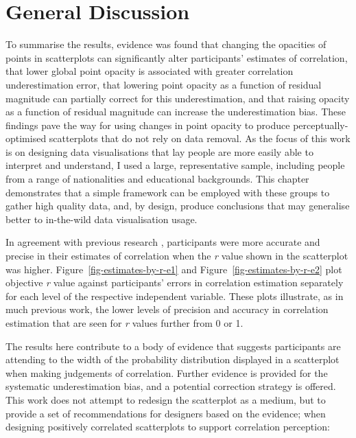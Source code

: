 \documentclass[../main.tex]{subfiles}
\begin{document}
\section{General Discussion}\label{general-discussion-adjusting-opacity}

To summarise the results, evidence was found that changing the opacities
of points in scatterplots can significantly alter participants'
estimates of correlation, that lower global point opacity is associated
with greater correlation underestimation error, that lowering point
opacity as a function of residual magnitude can partially correct for
this underestimation, and that raising opacity as a function of residual
magnitude can increase the underestimation bias. These findings pave the
way for using changes in point opacity to produce perceptually-optimised
scatterplots that do not rely on data removal. As the focus of this work
is on designing data visualisations that lay people are more easily able
to interpret and understand, I used a large, representative sample,
including people from a range of nationalities and educational
backgrounds. This chapter demonstrates that a simple framework can be
employed with these groups to gather high quality data, and, by design,
produce conclusions that may generalise better to in-the-wild data
visualisation usage.

In agreement with previous research
\cite{pollack_1960, rensink_2010, rensink_2012,
rensink_2014, rensink_2017}, participants were more accurate and precise
in their estimates of correlation when the \emph{r} value shown in the
scatterplot was higher. Figure~\ref{fig-estimates-by-r-e1} and
Figure~\ref{fig-estimates-by-r-e2} plot objective \emph{r} value against
participants' errors in correlation estimation separately for each level
of the respective independent variable. These plots illustrate, as in
much previous work, the lower levels of precision and accuracy in
correlation estimation that are seen for \emph{r} values further from 0
or 1.

The results here contribute to a body of evidence that suggests
participants are attending to the width of the probability distribution
displayed in a scatterplot
\cite{cleveland_1982, meyer_1997, rensink_2017, yang_2019} when making
judgements of correlation. Further evidence is provided for the
systematic underestimation bias, and a potential correction strategy is
offered. This work does not attempt to redesign the scatterplot as a
medium, but to provide a set of recommendations for designers based on
the evidence; when designing positively correlated scatterplots to
support correlation perception:
\end{document}
